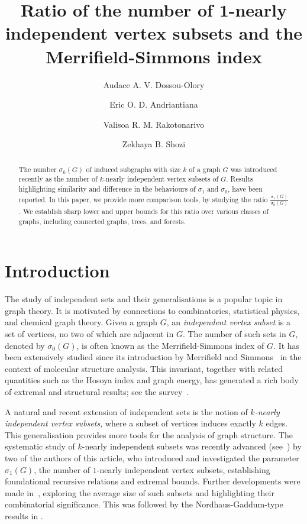 \documentclass[a4paper,12pt]{amsart}
\title[DOSSOU-OLORY, ANDRIANTIANA, RAKOTONARIVO, AND SHOZI]{Ratio of the number of $\mathbf{1}$-nearly independent vertex subsets and the Merrifield-Simmons index}
\author[Dossou-Olory]{Audace A. V. Dossou-Olory}
\author[Andriantiana]{Eric O. D.  Andriantiana}
\author[Rakotonarivo]{Valisoa R. M. Rakotonarivo}
\author[Shozi]{Zekhaya B. Shozi}
\begin{document}
\begin{abstract}
The number $\sigma_k(G)$ of induced subgraphs with size $k$ of a graph $G$ was introduced recently as the number of $k$-nearly independent vertex subsets of $G$. Results highlighting similarity and difference in the behaviours of $\sigma_1$ and $\sigma_0$, have been reported. In this paper, we provide more comparison tools, by studying the ratio $\frac{\sigma_1(G)}{\sigma_{0}(G)}$. We establish sharp lower and upper bounds for this ratio over various classes of graphs, including connected graphs, trees, and forests. 

\end{abstract}

\maketitle


\section{Introduction}
The study of independent sets and their generalisations is a popular topic in graph theory. It is motivated by connections to combinatorics, statistical physics, and chemical graph theory. Given a graph $G$, an \emph{independent vertex subset} is a set of vertices, no two of which are adjacent in $G$. The number of such sets in $G$, denoted by $\sigma_0(G)$, is often known as the Merrifield-Simmons index of $G$. It has been extensively studied since its introduction by Merrifield and Simmons~\cite{merrifield1981enumeration} in the context of molecular structure analysis. This invariant, together with related quantities such as the Hosoya index and graph energy, has generated a rich body of extremal and structural results; see the survey~\cite{wagner2010maxima}. 

A natural and recent extension of independent sets is the notion of \emph{$k$-nearly independent vertex subsets}, where a subset of vertices induces exactly $k$ edges. This generalisation provides more tools for the analysis of graph structure. The systematic study of $k$-nearly independent subsets was recently advanced (see~\cite{andriantiana2024number}) by two of the authors of this article, who introduced and investigated the parameter $\sigma_1(G)$, the number of $1$-nearly independent vertex subsets, establishing foundational recursive relations and extremal bounds. Further developments were made in~\cite{DossouOloryAndriantiana2025}, exploring the average size of such subsets and highlighting their combinatorial significance. This was followed by the Nordhaus-Gaddum-type results in \cite{andriantiana2026nordhaus}.
\end{document}
